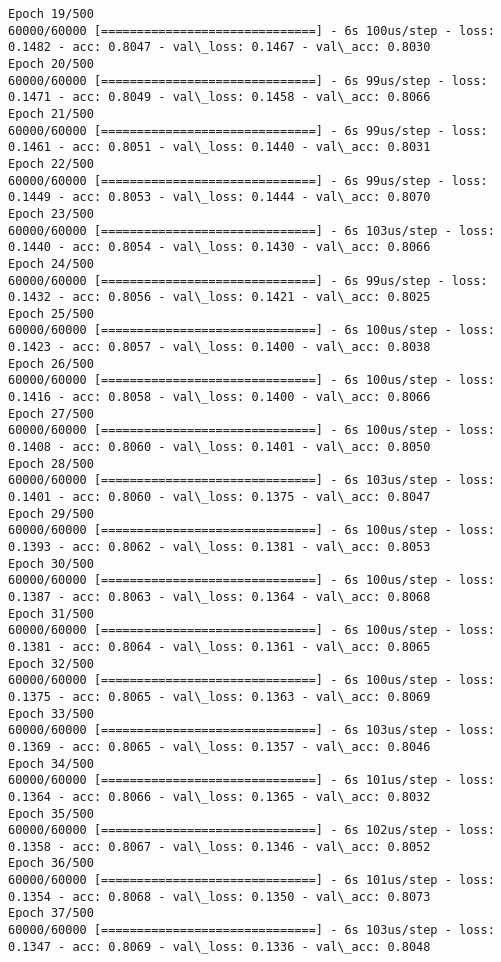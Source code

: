\documentclass[11pt]{article}
\begin{document}
\begin{Verbatim}[commandchars=\\\{\}]
Epoch 19/500
60000/60000 [==============================] - 6s 100us/step - loss: 0.1482 - acc: 0.8047 - val\_loss: 0.1467 - val\_acc: 0.8030
Epoch 20/500
60000/60000 [==============================] - 6s 99us/step - loss: 0.1471 - acc: 0.8049 - val\_loss: 0.1458 - val\_acc: 0.8066
Epoch 21/500
60000/60000 [==============================] - 6s 99us/step - loss: 0.1461 - acc: 0.8051 - val\_loss: 0.1440 - val\_acc: 0.8031
Epoch 22/500
60000/60000 [==============================] - 6s 99us/step - loss: 0.1449 - acc: 0.8053 - val\_loss: 0.1444 - val\_acc: 0.8070
Epoch 23/500
60000/60000 [==============================] - 6s 103us/step - loss: 0.1440 - acc: 0.8054 - val\_loss: 0.1430 - val\_acc: 0.8066
Epoch 24/500
60000/60000 [==============================] - 6s 99us/step - loss: 0.1432 - acc: 0.8056 - val\_loss: 0.1421 - val\_acc: 0.8025
Epoch 25/500
60000/60000 [==============================] - 6s 100us/step - loss: 0.1423 - acc: 0.8057 - val\_loss: 0.1400 - val\_acc: 0.8038
Epoch 26/500
60000/60000 [==============================] - 6s 100us/step - loss: 0.1416 - acc: 0.8058 - val\_loss: 0.1400 - val\_acc: 0.8066
Epoch 27/500
60000/60000 [==============================] - 6s 100us/step - loss: 0.1408 - acc: 0.8060 - val\_loss: 0.1401 - val\_acc: 0.8050
Epoch 28/500
60000/60000 [==============================] - 6s 103us/step - loss: 0.1401 - acc: 0.8060 - val\_loss: 0.1375 - val\_acc: 0.8047
Epoch 29/500
60000/60000 [==============================] - 6s 100us/step - loss: 0.1393 - acc: 0.8062 - val\_loss: 0.1381 - val\_acc: 0.8053
Epoch 30/500
60000/60000 [==============================] - 6s 100us/step - loss: 0.1387 - acc: 0.8063 - val\_loss: 0.1364 - val\_acc: 0.8068
Epoch 31/500
60000/60000 [==============================] - 6s 100us/step - loss: 0.1381 - acc: 0.8064 - val\_loss: 0.1361 - val\_acc: 0.8065
Epoch 32/500
60000/60000 [==============================] - 6s 100us/step - loss: 0.1375 - acc: 0.8065 - val\_loss: 0.1363 - val\_acc: 0.8069
Epoch 33/500
60000/60000 [==============================] - 6s 103us/step - loss: 0.1369 - acc: 0.8065 - val\_loss: 0.1357 - val\_acc: 0.8046
Epoch 34/500
60000/60000 [==============================] - 6s 101us/step - loss: 0.1364 - acc: 0.8066 - val\_loss: 0.1365 - val\_acc: 0.8032
Epoch 35/500
60000/60000 [==============================] - 6s 102us/step - loss: 0.1358 - acc: 0.8067 - val\_loss: 0.1346 - val\_acc: 0.8052
Epoch 36/500
60000/60000 [==============================] - 6s 101us/step - loss: 0.1354 - acc: 0.8068 - val\_loss: 0.1350 - val\_acc: 0.8073
Epoch 37/500
60000/60000 [==============================] - 6s 103us/step - loss: 0.1347 - acc: 0.8069 - val\_loss: 0.1336 - val\_acc: 0.8048

\end{Verbatim}
\end{document}
